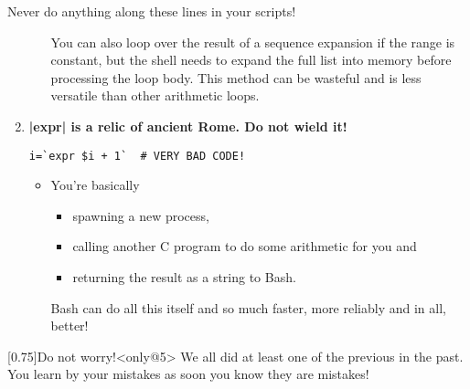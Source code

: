 \begin{frame}[fragile]{Never do anything along these lines in your scripts!}
\begin{enumerate}
\begin{itemize}
                      You can also loop over the result of a sequence expansion if the range is constant, but the shell needs to expand the full list into memory before processing the loop body.
                      This method can be wasteful and is less versatile than other arithmetic loops.
            \end{itemize}
        \item<only@5>
            \alert{\large\textbf{\bash|expr| is a relic of ancient Rome. Do not wield it!}}
            \begin{lstlisting}[style=MyBash, numbers=none, aboveskip=2mm, xrightmargin=48mm]
                i=`expr $i + 1`  # VERY BAD CODE!
            \end{lstlisting}
            \begin{itemize}
                \item You're basically
                      \begin{itemize}
                          \item spawning a new process,
                          \item calling another C program to do some arithmetic for you and
                          \item returning the result as a string to Bash.
                      \end{itemize}
                      Bash can do all this itself and so much faster, more reliably and in all, better!
            \end{itemize}
            \medskip
    \end{enumerate}
    \begin{varblock}{}[0.75\textwidth]{Do not worry!}<only@5>
        We all did at least one of the previous in the past.\\
        You learn by your mistakes as soon you know they are mistakes!
    \end{varblock}
\end{frame}
